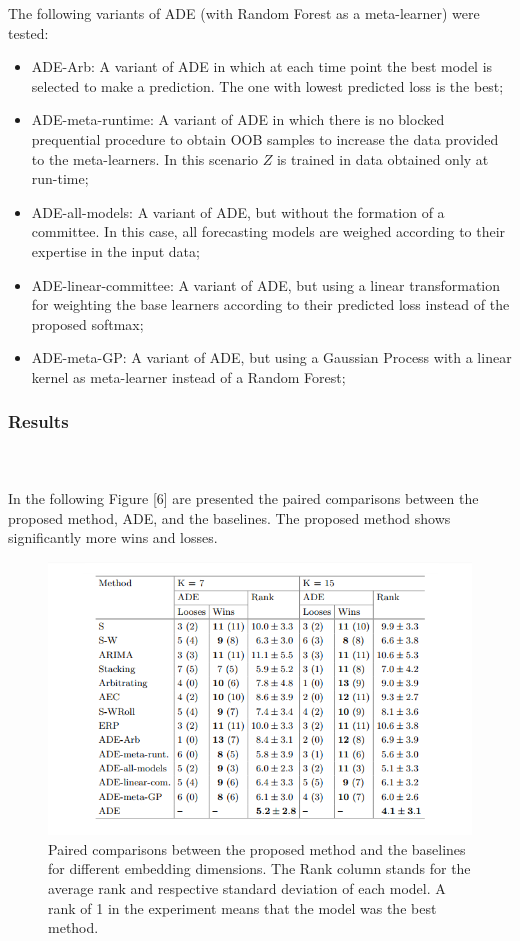\documentclass[runningheads,a4paper]{llncs}[2015/06/24]
\begin{document}
The following variants of ADE (with Random Forest as a meta-learner) were tested:
\begin{itemize}
\item ADE-Arb: A variant of ADE in which at each time point the best model is selected to make a prediction. The one with lowest predicted loss is the best;
\item ADE-meta-runtime: A variant of ADE in which there is no blocked prequential procedure to obtain OOB samples to increase the data provided to the meta-learners. In this scenario $Z$ is trained in data obtained only at run-time;
\item ADE-all-models: A variant of ADE, but without the formation of a committee. In this case, all forecasting models are weighed according to their expertise in the input data;
\item ADE-linear-committee: A variant of ADE, but using a linear transformation for weighting the base learners according to their predicted loss instead of the proposed softmax;
\item ADE-meta-GP: A variant of ADE, but using a Gaussian Process with a linear kernel as meta-learner instead of a Random Forest;
\end{itemize}
\subsubsection{Results}
\hspace{1cm}\\\\ In the following Figure [6] are presented the paired comparisons between the proposed method, ADE, and the baselines. The proposed method shows significantly more wins and losses. 

\begin{figure}[h]
\centering
\includegraphics[width=\textwidth]{pairedComparison}
\caption{Paired comparisons between the proposed method and the baselines for different embedding dimensions. The Rank column stands for the average rank and respective standard deviation of each model. A rank of 1 in the
experiment means that the model was the best method.}
\label{fig:paired comparison}
\end{figure}
\end{document}
